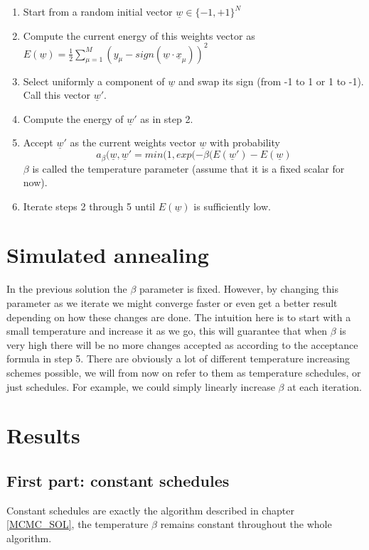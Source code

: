 \documentclass[a4paper]{article}
\begin{document}
\begin{enumerate}
\item Start from a random initial vector $\underline{w} \in \{-1, +1\}^{N}$
\item Compute the current energy of this weights vector as $E(\underline{w}) = \frac{1}{2} \sum_{\mu = 1}^{M} (y_{\mu} - sign(\underline{w} \cdot \underline{x}_{\mu}))^2$
\item Select uniformly a component of $\underline{w}$ and swap its sign (from -1 to 1 or 1 to -1). Call this vector $\underline{w}'$.
\item Compute the energy of $\underline{w}'$ as in step 2. 
\item Accept $\underline{w}'$ as the current weights vector  $\underline{w}$ with probability \[a_{\beta}(\underline{w}, \underline{w}' = min(1, exp(-\beta(E(\underline{w}') - E(\underline{w})\] $\beta$ is called the temperature parameter (assume that it is a fixed scalar for now).
\item Iterate steps 2 through 5 until $E(\underline{w})$ is sufficiently low.
\end{enumerate}

\section{Simulated annealing}

In the previous solution the $\beta$ parameter is fixed. However, by changing this parameter as we iterate we might converge faster or even get a better result depending on how these changes are done. The intuition here is to start with a small temperature and increase it as we go, this will guarantee that when $\beta$ is very high there will be no more changes accepted as according to the acceptance formula in step 5.
There are obviously a lot of different temperature increasing schemes possible, we will from now on refer to them as temperature schedules, or just schedules. For example, we could simply linearly increase $\beta$ at each iteration.

\section{Results}
\subsection{First part: constant schedules}

Constant schedules are exactly the algorithm described in chapter \ref{MCMC_SOL}, the temperature $\beta$ remains constant throughout the whole algorithm.
\end{document}
